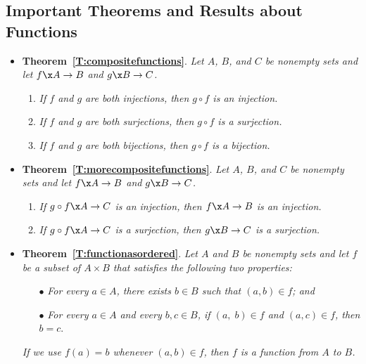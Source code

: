 \subsection*{Important Theorems and Results about Functions} 
\begin{itemize}
\item \textbf{Theorem~\ref{T:compositefunctions}}.
\emph{Let  $A$, $B$, and  $C$  be nonempty sets and let  $f\x A \to B$ and  $g\x B \to C$.}

\begin{enumerate}
\item \emph{If  $f$  and  $g$  are both injections, then  $g \circ f$  is an injection.} 

\item \emph{If  $f$  and  $g$  are both surjections, then  $g \circ f$  is a surjection.}

\item \emph{If  $f$  and  $g$  are both bijections, then  $g \circ f$  is a bijection.} 
\end{enumerate}

\item \textbf{Theorem~\ref{T:morecompositefunctions}}.
\emph{Let  $A$, $B$, and  $C$  be nonempty sets and let  $f\x A \to B$ and  $g\x B \to C$.}

\begin{enumerate}
\item \emph{If  $g \circ f\x A \to C$  is an injection, then  $f\x A \to B$  is an injection. }

\item \emph{If  $g \circ f\x A \to C$ is a surjection, then  $g\x B \to C$ is a surjection. }
\end{enumerate}

\item \textbf{Theorem~\ref{T:functionasordered}}.  
\emph{Let  $A$  and  $B$  be nonempty sets and let $f$ be a subset of $A \times B$ that satisfies the following two properties:}

\begin{itemize}
\item[$\bullet$] \emph{For every  $a \in A$, there exists  $b \in B$  such that  
$( {a, b} ) \in f$; and}

\item[$\bullet$] \emph{For every  $a \in A$ and every  $b, c \in B$, if  $( {a,\;b} ) \in f$  and  $( {a, c} ) \in f$, then  $b = c$}.
\end{itemize}

\emph{If we use  $f( a ) = b$ whenever  $( {a, b} ) \in f$, then  $f$  is a function from  $A$  to  $B$.}


\end{itemize}
